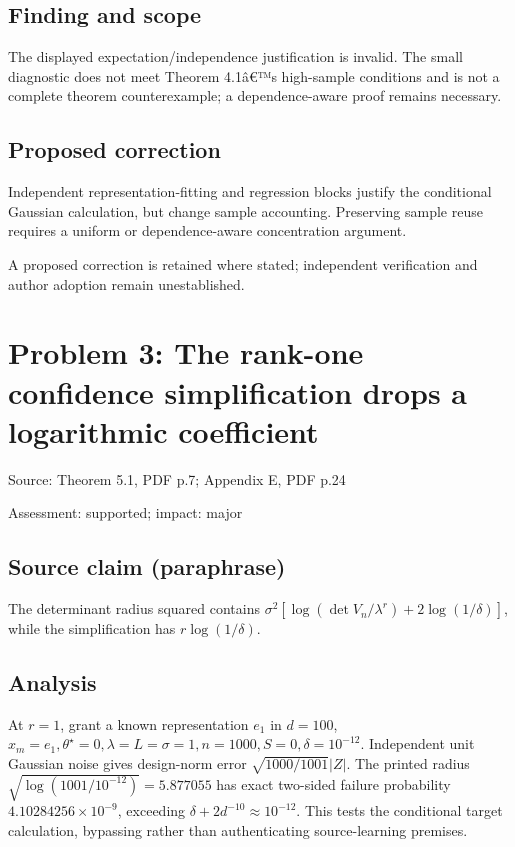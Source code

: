 \documentclass[11pt]{article}
\begin{document}
\subsection*{Finding and scope}

The displayed expectation/independence justification is invalid. The small diagnostic does not meet Theorem 4.1â€™s high-sample conditions and is not a complete theorem counterexample; a dependence-aware proof remains necessary.

\subsection*{Proposed correction}

Independent representation-fitting and regression blocks justify the conditional Gaussian calculation, but change sample accounting. Preserving sample reuse requires a uniform or dependence-aware concentration argument.

A proposed correction is retained where stated; independent verification and author adoption remain unestablished.

\section*{Problem 3: The rank-one confidence simplification drops a logarithmic coefficient}

Source: Theorem 5.1, PDF p.7; Appendix E, PDF p.24

Assessment: supported; impact: major

\subsection*{Source claim (paraphrase)}

The determinant radius squared contains \(\sigma^2[\log(\det V_n/\lambda^r)+2\log(1/\delta)]\), while the simplification has \(r\log(1/\delta)\).

\subsection*{Analysis}

At \(r=1\), grant a known representation \(e_1\) in \(d=100\), \(x_m=e_1,\theta^\star=0,\lambda=L=\sigma=1,n=1000,S=0,\delta=10^{-12}\). Independent unit Gaussian noise gives design-norm error \(\sqrt{1000/1001}|Z|\). The printed radius \(\sqrt{\log(1001/10^{-12})}=5.877055\) has exact two-sided failure probability \(4.10284256\times10^{-9}\), exceeding \(\delta+2d^{-10}\approx10^{-12}\). This tests the conditional target calculation, bypassing rather than authenticating source-learning premises.
\end{document}
